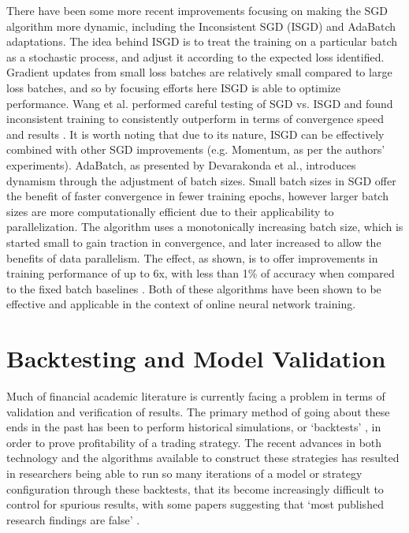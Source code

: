 \documentclass[a4paper,latin]{paper}
\begin{document}
There have been some more recent improvements focusing on making the SGD algorithm more dynamic, 
including the Inconsistent SGD (ISGD) and AdaBatch adaptations. The idea behind ISGD is to treat the training 
on a particular batch as a stochastic process, and adjust it according to the expected loss identified. Gradient 
updates from small loss batches are relatively small compared to large loss batches, and so by focusing efforts 
here ISGD is able to optimize performance. Wang et al. performed careful testing of SGD vs. ISGD and found 
inconsistent training to consistently outperform in terms of convergence speed and results \cite{Wang}. It is worth 
noting that due to its nature, ISGD can be effectively combined with other SGD improvements (e.g. Momentum, 
as per the authors’ experiments). AdaBatch, as presented by Devarakonda et al., introduces dynamism through 
the adjustment of batch sizes. Small batch sizes in SGD offer the benefit of faster convergence in fewer training 
epochs, however larger batch sizes are more computationally efficient due to their applicability to parallelization. 
The algorithm uses a monotonically increasing batch size, which is started small to gain traction in convergence, 
and later increased to allow the benefits of data parallelism. The effect, as shown, is to offer improvements in 
training performance of up to 6x, with less than 1\% of accuracy when compared to the fixed batch baselines \cite{Devarakonda}. 
Both of these algorithms have been shown to be effective and applicable in the context of online neural network training.
\hfill\break

\section{Backtesting and Model Validation} 
\hfill

Much of financial academic literature is currently facing a problem in terms of validation and verification of results. 
The primary method of going about these ends in the past has been to perform historical simulations, or ‘backtests’ ,
in order to prove profitability of a trading strategy. The recent advances in both technology and the algorithms available 
to construct these strategies has resulted in researchers being able to run so many iterations of a model or strategy
 configuration through these backtests, that its become increasingly difficult to control for spurious results, with some 
 papers suggesting that ‘most published research findings are false’   \cite{Ioannidis}.
\hfill \break 
\end{document}
